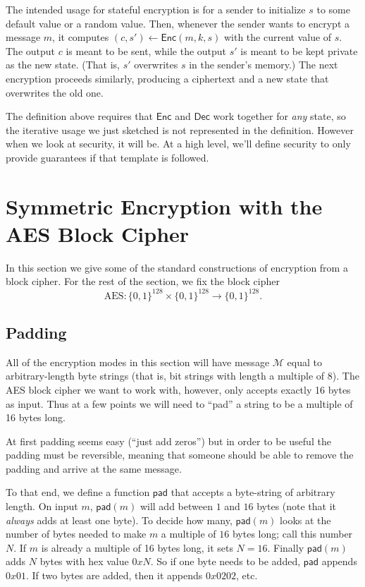 \documentclass[11pt]{article}
\newcommand{\msgs}{\mathcal{M}}
\newcommand{\Enc}{\mathsf{Enc}}
\newcommand{\Dec}{\mathsf{Dec}}
\newcommand{\bits}{\{0,1\}}
\newcommand{\aes}{\mathrm{AES}}
\newcommand{\pad}{\mathsf{pad}}
\begin{document}
The intended usage for stateful encryption is for a sender to initialize
$s$ to some default value or a random value. Then, whenever the sender
wants to encrypt a message $m$, it computes $(c,s') \gets \Enc(m,k,s)$ with the
current value of $s$. The output $c$ is meant to be sent, while the output
$s'$ is meant to be kept private as the new state. (That is, $s'$ overwrites
$s$ in the sender's memory.) The next encryption proceeds similarly, producing
a ciphertext and a new state that overwrites the old one.

The definition above requires that $\Enc$ and $\Dec$ work together for
\emph{any} state, so the iterative usage we just sketched is not represented in
the definition. However when we look at security, it will be. At a high level,
we'll define security to only provide guarantees if that template is followed.


\section{Symmetric Encryption with the AES Block Cipher}

In this section we give some of the standard constructions of encryption
from a block cipher. For the rest of the section, we fix the block cipher
\[
    \aes :\bits^{128} \times \bits^{128} \to \bits^{128}.
\]

\subsection{Padding}

All of the encryption modes in this section will have message $\msgs$ equal to
arbitrary-length byte strings (that is, bit strings with length a multiple of
$8$).  The AES block cipher we want to work with, however, only accepts exactly
16 bytes as input. Thus at a few points we will need to ``pad'' a string to be
a multiple of 16 bytes long.

At first padding seems easy (``just add zeros'') but in order to be useful
the padding must be reversible, meaning that someone should be able to remove
the padding and arrive at the same message.

To that end, we define a function $\pad$ that accepts a byte-string of
arbitrary length. On input $m$, $\pad(m)$ will add between $1$ and $16$ bytes
(note that it \emph{always} adds at least one byte). To decide how many,
$\pad(m)$ looks at the number of bytes needed to make $m$ a multiple of $16$
bytes long; call this number $N$. If $m$ is already a multiple of 16 bytes
long, it sets $N=16$. Finally $\pad(m)$ adds $N$ bytes with hex value $0xN$.
So if one byte needs to be added, $\pad$ appends $0x01$. If two bytes are
added, then it appends $0x0202$, etc.
\end{document}
